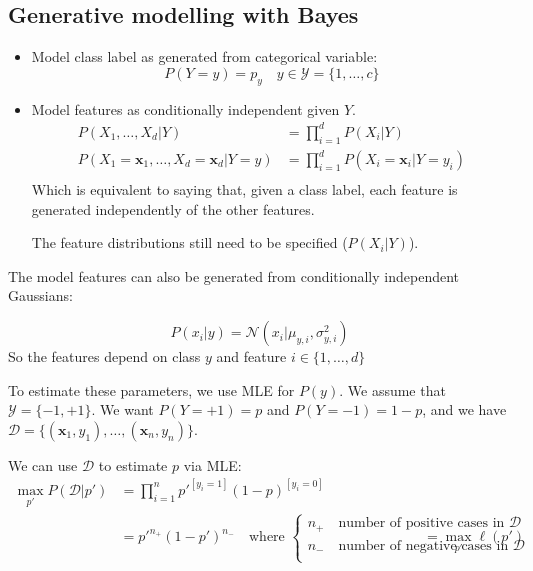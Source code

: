 \documentclass[a4paper,10pt,twoside]{article}
\begin{document}
\subsection{Generative modelling with Bayes}

\begin{itemize}
\item Model class label as generated from categorical variable:
  \begin{equation*}
    P(Y=y) = p_y \quad y\in\mathcal{Y}=\{1,\ldots, c\}
  \end{equation*}
\item Model features as conditionally independent given $Y$.
  \begin{align*}
    P(X_1,\ldots, X_d|Y)&=\prod_{i=1}^{d}P(X_i|Y)\\
    P(X_1=\mathbf{x}_1,\ldots, X_d=\mathbf{x}_d|Y=y)&=\prod_{i=1}^{d}P(X_i=\mathbf{x}_i|Y=y_i)\\
  \end{align*}
Which is equivalent to saying that, given a class label, each feature is generated independently of the other features.

The feature distributions still need to be specified ($P(X_i|Y)$).
\end{itemize}

The model features can also be generated from conditionally independent Gaussians:

\begin{equation*}
  P(x_i|y)=\mathcal{N}(x_i|\mu_{y,i},\sigma^2_{y,i})
\end{equation*}
So the features depend on class $y$ and feature $i\in\{1,\ldots, d\}$

To estimate these parameters, we use MLE for $P(y)$. We assume that $\mathcal{Y}=\{-1,+1\}$. We want $P(Y=+1)=p$ and $P(Y=-1)=1-p$, and we have $\mathcal{D}=\{(\mathbf{x}_1,y_1), \ldots, (\mathbf{x}_n,y_n)\}$.

We can use $\mathcal{D}$ to estimate $p$ via MLE:
\begin{align*}
  \max_{p'}P(\mathcal{D}|p')&=\prod_{i=1}^{n}p'^{[y_i=1]}(1-p)^{[y_i=0]}\\
                            &=p'^{n_+}(1-p')^{n_-}\quad\text{where }
                    \begin{cases}
                      n_+ \quad\text{number of positive cases in }\mathcal{D}\\
                      n_- \quad\text{number of negative cases in }\mathcal{D}\\
                    \end{cases}
                            &=\max_{p' }\ell(p')
\end{align*}
\end{document}
